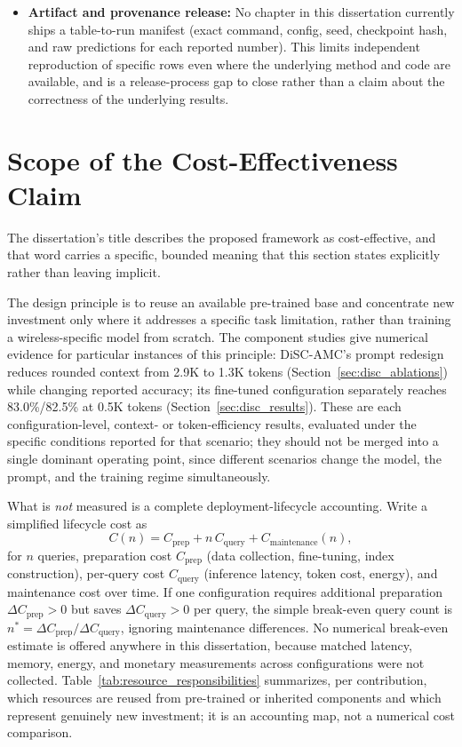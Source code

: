 \begin{itemize}
    \item \textbf{Artifact and provenance release:} No chapter in this dissertation currently ships a table-to-run manifest (exact command, config, seed, checkpoint hash, and raw predictions for each reported number). This limits independent reproduction of specific rows even where the underlying method and code are available, and is a release-process gap to close rather than a claim about the correctness of the underlying results.
\end{itemize}

\section{Scope of the Cost-Effectiveness Claim}
\label{sec:cost_effectiveness_scope}

The dissertation's title describes the proposed framework as cost-effective, and that word carries a specific, bounded meaning that this section states explicitly rather than leaving implicit.

The design principle is to reuse an available pre-trained base and concentrate new investment only where it addresses a specific task limitation, rather than training a wireless-specific model from scratch. The component studies give numerical evidence for particular instances of this principle: DiSC-AMC's prompt redesign reduces rounded context from 2.9K to 1.3K tokens (Section~\ref{sec:disc_ablations}) while changing reported accuracy; its fine-tuned configuration separately reaches 83.0\%/82.5\% at 0.5K tokens (Section~\ref{sec:disc_results}). These are each configuration-level, context- or token-efficiency results, evaluated under the specific conditions reported for that scenario; they should not be merged into a single dominant operating point, since different scenarios change the model, the prompt, and the training regime simultaneously.

What is \emph{not} measured is a complete deployment-lifecycle accounting. Write a simplified lifecycle cost as
\begin{equation}
    C(n) = C_{\mathrm{prep}} + n \, C_{\mathrm{query}} + C_{\mathrm{maintenance}}(n),
\end{equation}
for $n$ queries, preparation cost $C_{\mathrm{prep}}$ (data collection, fine-tuning, index construction), per-query cost $C_{\mathrm{query}}$ (inference latency, token cost, energy), and maintenance cost over time. If one configuration requires additional preparation $\Delta C_{\mathrm{prep}} > 0$ but saves $\Delta C_{\mathrm{query}} > 0$ per query, the simple break-even query count is $n^* = \Delta C_{\mathrm{prep}} / \Delta C_{\mathrm{query}}$, ignoring maintenance differences. No numerical break-even estimate is offered anywhere in this dissertation, because matched latency, memory, energy, and monetary measurements across configurations were not collected. Table~\ref{tab:resource_responsibilities} summarizes, per contribution, which resources are reused from pre-trained or inherited components and which represent genuinely new investment; it is an accounting map, not a numerical cost comparison.

